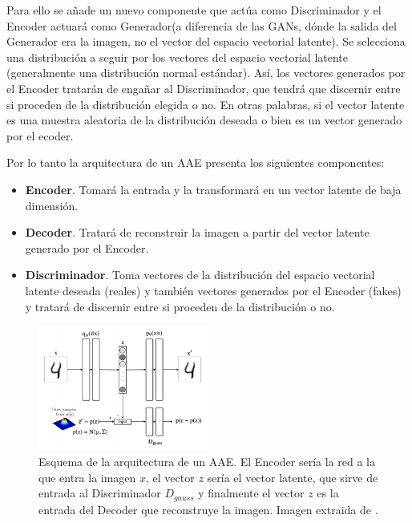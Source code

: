             \medskip

            \noindent Para ello se añade un nuevo componente que actúa como Discriminador y el Encoder actuará como Generador(a diferencia de las GANs, dónde la salida del Generador era la imagen, no el vector del espacio vectorial latente). Se selecciona una distribución a seguir por los vectores del espacio vectorial latente (generalmente una distribución normal estándar). Así, los vectores generados por el Encoder tratarán de engañar al Discriminador, que tendrá que discernir entre si proceden de la distribución elegida o no. En otras palabras, si el vector latente es una muestra aleatoria de la distribución deseada o bien es un vector generado por el ecoder.

            \medskip

            \noindent Por lo tanto la arquitectura de un AAE presenta los siguientes componentes: 

            \begin{itemize}
                \item \textbf{Encoder}. Tomará la entrada y la transformará en un vector latente de baja dimensión.
                \item \textbf{Decoder}. Tratará de reconstruir la imagen a partir del vector latente generado por el Encoder. 
                \item \textbf{Discriminador}. Toma vectores de la distribución del espacio vectorial latente deseada (reales) y también vectores generados por el Encoder (fakes) y tratará de discernir entre si proceden de la distribución o no.
            \end{itemize}

            \begin{figure}[!h]
                \centering
                \includegraphics[width=0.5\textwidth]{img/AAE.png}
                \caption{Esquema de la arquitectura de un AAE. El Encoder sería la red a la que entra la imagen $x$, el vector $z$ sería el vector latente, que sirve de entrada al Discriminador $D_{gauss}$ y finalmente el vector $z$ es la entrada del Decoder que reconstruye la imagen. Imagen extraida de \cite{AAE}.}
                \label{fig:AAE}
            \end{figure}

